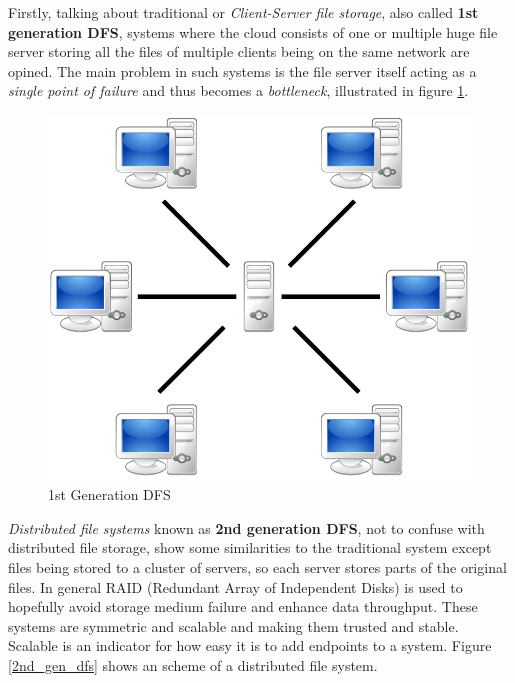 Firstly, talking about traditional or \textit{Client-Server file storage}, also called \textbf{1st generation DFS}, systems where the cloud consists of one or multiple huge file server storing all the files of multiple clients being on the same network are opined. The main problem in such systems is the file server itself acting as a \textit{single point of failure} and thus becomes a \textit{bottleneck}, illustrated in figure \ref{1st_gen_dfs}.
	\begin{figure}[H]
		\begin{center}
		\includegraphics[scale=0.25]{Talk5/1st_gen_dfs.PNG}
		\end{center}
		\caption{1st Generation DFS \cite{wikimedia:p2p}}
		\label{1st_gen_dfs}
	\end{figure}
\textit{Distributed file systems} known as \textbf{2nd generation DFS}, not to confuse with distributed file storage, show some similarities to the traditional system except files being stored to a cluster of servers, so each server stores parts of the original files. In general RAID (Redundant Array of Independent Disks) is used to hopefully avoid storage medium failure and enhance data throughput. These systems are symmetric and scalable and making them trusted and stable. Scalable is an indicator for how easy it is to add endpoints to a system. Figure \ref{2nd_gen_dfs} shows an scheme of a distributed file system.
